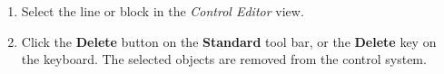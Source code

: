 \begin{enumerate}
\item
  Select the line or block in the {\sl Control Editor} view.


\item
  Click the \textbf{Delete} button on the \textbf{Standard} tool bar,
  or the \textbf{Delete} key on the keyboard.
  The selected objects are removed from the control system.
\end{enumerate}

\vskip-14mm

